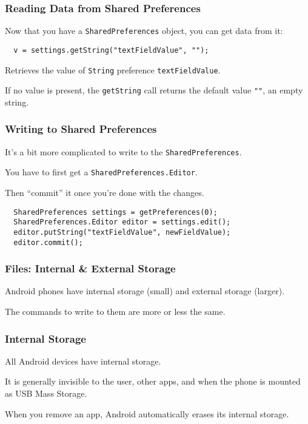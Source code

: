 \begin{frame}[fragile]
\frametitle{Reading Data from Shared Preferences}
\begin{changemargin}{1cm}
Now that you have a {\tt SharedPreferences} object, you can get data from it:

\begin{lstlisting}
  v = settings.getString("textFieldValue", "");
\end{lstlisting}
Retrieves the value of {\tt String} preference {\tt textFieldValue}. 
  
  If no value is present, the {\tt getString} call
returns the default value {\tt ""}, an empty string.

\end{changemargin}
\end{frame}


\begin{frame}[fragile]
\frametitle{Writing to Shared Preferences}
\begin{changemargin}{1cm}

It's a bit more complicated to write to the {\tt SharedPreferences}.

You have to first get a {\tt SharedPreferences.Editor}.

Then ``commit'' it once you're done with the changes.

\begin{lstlisting}
  SharedPreferences settings = getPreferences(0);
  SharedPreferences.Editor editor = settings.edit();
  editor.putString("textFieldValue", newFieldValue);
  editor.commit();
\end{lstlisting}


\end{changemargin}
\end{frame}


\begin{frame}
\frametitle{Files: Internal \& External Storage}

\begin{changemargin}{1cm}
Android phones have internal storage (small) and external storage
(larger).

The commands to write to them are more or less the same.

\end{changemargin}
\end{frame}

\begin{frame}
\frametitle{Internal Storage}
\begin{changemargin}{1cm}

All Android devices have internal storage. 

It is generally
invisible to the user, other apps, and when the phone is mounted as
USB Mass Storage. 

When you remove an app, Android automatically
erases its internal storage. 

\end{changemargin}
\end{frame}

